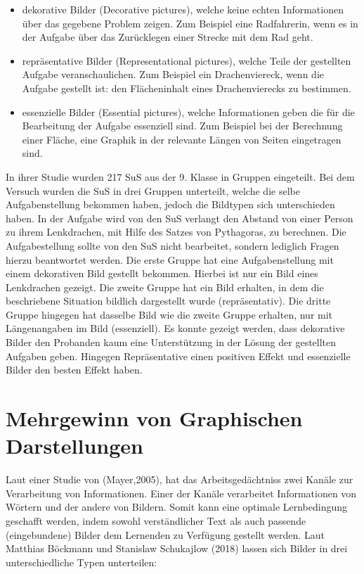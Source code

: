     \begin{itemize}
        \item dekorative Bilder (Decorative pictures), welche keine echten Informationen über das gegebene Problem zeigen. Zum Beispiel eine Radfahrerin, wenn es in der Aufgabe über das Zurücklegen einer Strecke mit dem Rad geht.
        \item repräsentative Bilder (Representational pictures), welche Teile der gestellten Aufgabe veranschaulichen. Zum Beispiel ein Drachenviereck, wenn die Aufgabe gestellt ist: den Flächeninhalt eines Drachenvierecks zu bestimmen. 
        \item essenzielle Bilder (Essential pictures), welche Informationen geben die für die Bearbeitung der Aufgabe essenziell sind. Zum Beispiel bei der Berechnung einer Fläche, eine Graphik in der relevante Längen von Seiten eingetragen sind.
    \end{itemize}

In ihrer Studie wurden 217 SuS aus der 9. Klasse in Gruppen eingeteilt. Bei dem Versuch wurden die SuS in drei Gruppen unterteilt, welche die selbe Aufgabenstellung bekommen haben, jedoch die Bildtypen sich unterschieden haben. In der Aufgabe wird von den SuS verlangt den Abstand von einer Person zu ihrem Lenkdrachen, mit Hilfe des Satzes von Pythagoras, zu berechnen. Die Aufgabestellung sollte von den SuS nicht bearbeitet, sondern lediglich Fragen hierzu beantwortet werden. 
Die erste Gruppe hat eine Aufgabenstellung mit einem dekorativen Bild gestellt bekommen. Hierbei ist nur ein Bild eines Lenkdrachen gezeigt.
Die zweite Gruppe hat ein Bild erhalten, in dem die beschriebene Situation bildlich dargestellt wurde (repräsentativ). Die dritte Gruppe hingegen hat dasselbe Bild wie die zweite Gruppe erhalten, nur mit Längenangaben im Bild (essenziell).
Es konnte gezeigt werden, dass dekorative Bilder den Probanden kaum eine Unterstützung in der Lösung der gestellten Aufgaben geben. Hingegen Repräsentative einen positiven Effekt und essenzielle Bilder den besten Effekt haben.\cite{mayer2005reliability}

\section{Mehrgewinn von Graphischen Darstellungen}

Laut einer Studie von (Mayer,2005), hat das Arbeitsgedächtniss zwei Kanäle zur Verarbeitung von Informationen. Einer der Kanäle verarbeitet Informationen von Wörtern und der andere von Bildern. Somit kann eine optimale Lernbedingung geschafft werden, indem sowohl verständlicher Text als auch passende (eingebundene) Bilder dem Lernenden zu Verfügung gestellt werden. Laut Matthias Böckmann und Stanislaw Schukajlow (2018) lassen sich Bilder in drei unterschiedliche Typen unterteilen:
    
